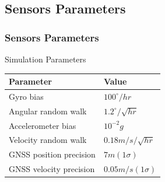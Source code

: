 \documentclass[compress]{beamer}    %
\begin{document}
\subsection{Sensors Parameters}
\begin{frame}
\frametitle{Sensors Parameters}
\begin{block}{Simulation Parameters}
\begin{table}%
\centering
\centering
    \begin{tabular}{|l|p{50mm}|} \hline 
      Parameter & Value \\ \hline  \hline 
      Gyro bias & $100^{\circ } /hr$ \\ \hline 
      Angular random walk & $1.2^{\circ } /\sqrt{hr} $ \\ \hline 
      Accelerometer bias & $10^{-2} g$ \\ \hline 
      Velocity random walk & $0.18m/s/\sqrt{hr} $ \\ \hline 
      GNSS position precision & $7m(1\sigma )$ \\ \hline 
      GNSS velocity precision & $0.05m/s(1\sigma )$ \\ \hline 
    \end{tabular}
  \label{tab:sim}
\end{table}
\end{block}
\end{frame}
\end{document}
